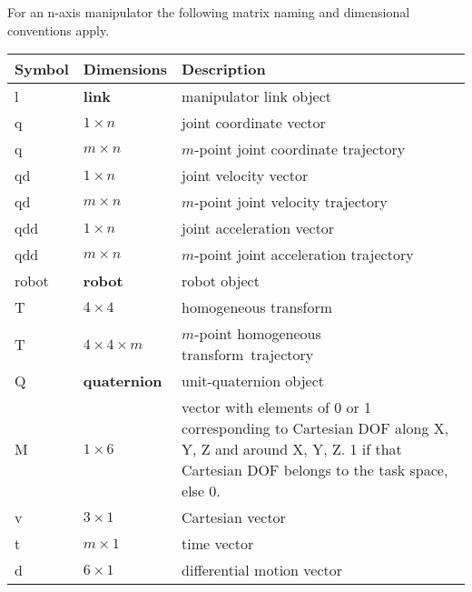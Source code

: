 \documentclass{article}
\newcommand{\var}[1]{{\vtt #1}}
\renewcommand{\hom}{homogeneous transform}
\begin{document}
\newcommand{\Mlab}{{\School M}{\eightTR ATLAB}}
\newcommand{\MLAB}{{\emph M}{\eightIT ATLAB}}
\newcommand{\undersec}[1]{\underline{\rule[-.70ex]{0cm}{0cm}#1}}


\pagestyle{fancyplain}
\rhead{\rm\thepage}
\cfoot{}
\setlength{\headrulewidth}{0pt}

\newpage   %
\def\be{\begin{equation}}
\def\ee{\end{equation}}
\newcommand{\under}[1]{\underline{\rule[-.70ex]{0cm}{0cm}#1}}
\renewcommand{\baselinestretch}{1.2}           %


\vskip 4mm
\vskip 2mm
\moveleft 1.25in\vbox{}

\vskip 5mm
{}

For an n-axis manipulator the following matrix naming and dimensional
conventions apply.

\begin{tabular}
{|lp{30mm}p{70mm}|}\hline
Symbol & Dimensions & Description\\ \hline
\var{l} & \textbf{link} & manipulator link object\\
\var{q} & $1 \times n$ & joint coordinate vector\\
\var{q} & $m \times n$ & $m$-point joint coordinate trajectory \\
\var{qd} & $1 \times n$ & joint velocity vector\\
\var{qd} & $m \times n$ & $m$-point joint velocity trajectory \\
\var{qdd} & $1 \times n$ & joint acceleration vector\\
\var{qdd} & $m \times n$ & $m$-point joint acceleration trajectory \\
\var{robot} & \textbf{robot} & robot object\\
\var{T} & $4 \times 4$ & \hom \\
\var{T} & $4 \times 4 \times m$ & $m$-point \hom\ trajectory\\
\var{Q} & \textbf{quaternion} & unit-quaternion object\\
\var{M} & $1 \times 6$ & vector with elements of 0 or 1 corresponding
to Cartesian DOF along X, Y, Z and around X, Y, Z.  1 if that Cartesian
DOF belongs to the task space, else 0.\\
\var{v} & $3 \times 1$ & Cartesian vector\\
\var{t} & $m\times 1$ & time vector\\
\var{d} & $6\times 1$ & differential motion vector\\ \hline
\end{tabular}
\end{document}
